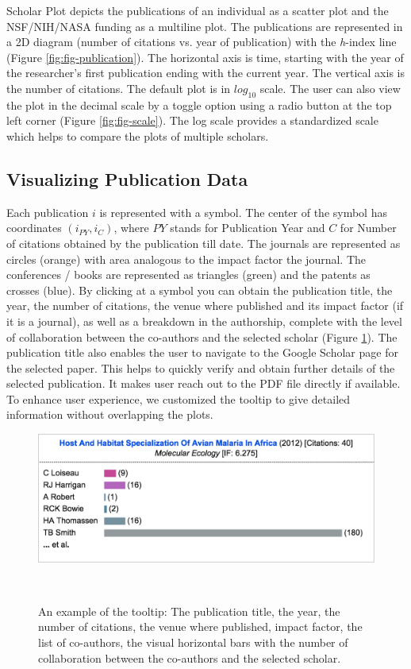 Scholar Plot depicts the publications of an individual as a scatter plot and the NSF/NIH/NASA funding as a multiline plot. The publications are represented in a 2D diagram (number of citations vs. year of publication) with the {\it h}-index line (Figure \ref{fig:fig-publication}). The horizontal axis is time, starting with the year of the researcher's first publication ending with the current year. The vertical axis is the number of citations. The default plot is in $log_{10}$ scale. The user can also view the plot in the decimal scale by a toggle option using a radio button at the top left corner (Figure \ref{fig:fig-scale}). The log scale provides a standardized scale which helps to compare the plots of multiple scholars.



\subsection{Visualizing Publication Data}
Each publication $i$ is represented with a symbol. The center of the symbol has coordinates $(i_{PY}, i_{C})$, where $PY$ stands for Publication Year and $C$ for Number of citations obtained by the publication till date. The journals are represented as circles (orange) with area analogous to the impact factor the journal. The conferences / books are represented as triangles (green) and the patents as crosses (blue). By clicking at a symbol you can obtain the publication title, the year, the number of citations, the venue where published and its impact factor (if it is a journal), as well as a breakdown in the authorship, complete with the level of collaboration between the co-authors and the selected scholar (Figure \ref{fig:fig-tooltip}). The publication title also enables the user to navigate to the Google Scholar page for the selected paper. This helps to quickly verify and obtain further details of the selected publication. It makes user reach out to the PDF file directly if available. To enhance user experience, we customized the tooltip to give detailed information without overlapping the plots.

\begin{figure}[H]
\centering
  \includegraphics[width=1\columnwidth]{figures/fig_tooltip}
  \caption{An example of the tooltip: The publication title, the year, the number of citations, the venue where published, impact factor, the list of co-authors, the visual horizontal bars with the number of collaboration between the co-authors and the selected scholar.}~\label{fig:fig-tooltip}
\end{figure}

